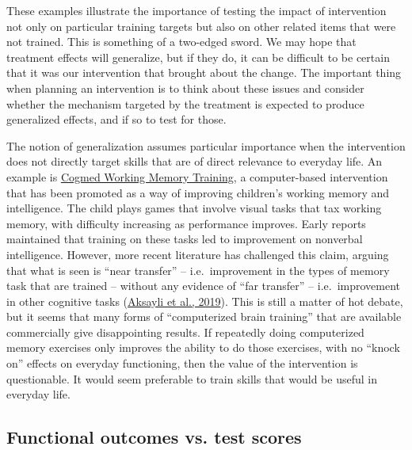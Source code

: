 \documentclass{krantz}
\begin{document}
These examples illustrate the importance of testing the impact of intervention not only on particular training targets but also on other related items that were not trained. This is something of a two-edged sword. We may hope that treatment effects will generalize, but if they do, it can be difficult to be certain that it was our intervention that brought about the change. The important thing when planning an intervention is to think about these issues and consider whether the mechanism targeted by the treatment is expected to produce generalized effects, and if so to test for those.

The notion of generalization assumes particular importance when the intervention does not directly target skills that are of direct relevance to everyday life. An example is \href{https://www.cogmed.com/}{Cogmed Working Memory Training}, a computer-based intervention that has been promoted as a way of improving children's working memory and intelligence. The child plays games that involve visual tasks that tax working memory, with difficulty increasing as performance improves. Early reports maintained that training on these tasks led to improvement on nonverbal intelligence. However, more recent literature has challenged this claim, arguing that what is seen is ``near transfer'' -- i.e.~improvement in the types of memory task that are trained -- without any evidence of ``far transfer'' -- i.e.~improvement in other cognitive tasks (\protect\hyperlink{ref-aksayli2019}{Aksayli et al., 2019}). This is still a matter of hot debate, but it seems that many forms of ``computerized brain training'' that are available commercially give disappointing results. If repeatedly doing computerized memory exercises only improves the ability to do those exercises, with no ``knock on'' effects on everyday functioning, then the value of the intervention is questionable. It would seem preferable to train skills that would be useful in everyday life.

\hypertarget{functional-outcomes-vs-test-scores}{%
\subsection{Functional outcomes vs. test scores}\label{functional-outcomes-vs-test-scores}}
\end{document}
